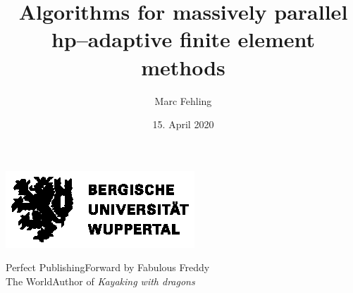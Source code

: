 \documentclass[10pt,a4paper,twoside,openright]{memoir}
\author{Marc Fehling}
\title{Algorithms for massively parallel hp--adaptive finite element methods}
\date{15. April 2020}
\begin{document}
  \begin{titlingpage}
    \begin{center}
      \vspace*{\fill}
      \includegraphics[width=.75\textwidth]{logos/BUW_Logo-schwarz.eps}\bigskip
      \vspace*{\fill}\vspace*{\fill}\par
      {\Huge \thetitle\bigskip\par}
      {\Huge \theauthor\bigskip\par}
      {\LARGE \thedate\bigskip\bigskip\par}
    \end{center}
    {\large Perfect Publishing\hspace*{\fill}Forward by Fabulous Freddy\smallskip\\
    The World\hspace*{\fill}Author of \emph{Kayaking with dragons}}
  \end{titlingpage}
  
  
  
  \frontmatter
  
  \abstractintoc
  
  \clearpage
  \begin{otherlanguage}{ngerman}
    
  \end{otherlanguage}
  \clearpage
  
  
  \begin{KeepFromToc} %
    \tableofcontents
  \end{KeepFromToc}
  \clearpage
  
  
  
  
  \listoffigures
  \clearpage
  
  \printglossary[type=\acronymtype, title={List of Abbreviations}]
  
  
\end{document}
